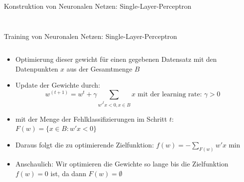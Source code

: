 \documentclass[aspectratio=1610, xcolor=dvipsnames, 9pt]{beamer}
\begin{document}
\begin{frame}{Konstruktion von Neuronalen Netzen: Single-Layer-Perceptron}
\begin{columns}
\begin{column}{0.3\textwidth}
\begin{figure}
       \end{figure}
          \end{column}
        \end{columns}
      \end{frame}

      \begin{frame}{Training von Neuronalen Netzen: Single-Layer-Perceptron}
        \begin{columns}
          \begin{column}{0.7\textwidth}
            \begin{itemize}
              \item Optimierung dieser gewicht für einen gegebenen Datensatz mit den Datenpunkten $x$ aus der Gesamtmenge $B$
              \item Update der Gewichte durch:
                    \begin{equation}
                       w ^{(t+1)} = w^t + \gamma \sum_{w'^t x <0, x \in B} x \text{ mit der learning rate:   } \gamma>0
                    \end{equation}
              \item mit der Menge der Fehlklassifizierungen im Schritt $t$: $F(w) = \{x \in B : w'x<0 \}$
              \item Daraus folgt die zu optimierende Zielfunktion: $ f(w) = -\sum_{F(w)} w'x $ \rightarrow min \newline
              \item Anschaulich: Wir optimieren die Gewichte so lange bis die Zielfunktion $f(w)=0$ ist, da dann $F(w)=\emptyset$ \newline


\end{itemize}
\end{column}
\end{columns}
\end{frame}
\end{document}
